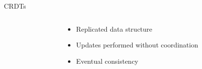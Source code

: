 \documentclass[10pt]{beamer}
\begin{document}
\begin{frame}{\acfp{CRDT}\cite{ShapiroSSS2011}}
\begin{columns}
\begin{column}{0.65\textwidth}
    \end{column}
    \begin{column}{0.35\textwidth}
      \begin{itemize}
        \item Replicated data structure
        \item<2-> Updates performed without coordination
        \item<5-> Eventual consistency
      \end{itemize}
    \end{column}
  \end{columns}
\end{frame}
\end{document}
